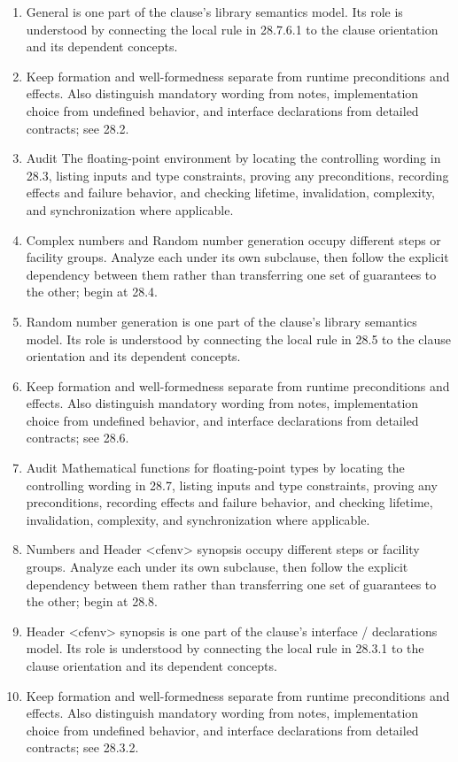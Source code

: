 \documentclass[11pt,letterpaper]{article}
\begin{document}
\begin{enumerate}
\item General is one part of the clause's library semantics model. Its role is understood by connecting the local rule in 28.7.6.1 to the clause orientation and its dependent concepts.
\item Keep formation and well-formedness separate from runtime preconditions and effects. Also distinguish mandatory wording from notes, implementation choice from undefined behavior, and interface declarations from detailed contracts; see 28.2.
\item Audit The floating-point environment by locating the controlling wording in 28.3, listing inputs and type constraints, proving any preconditions, recording effects and failure behavior, and checking lifetime, invalidation, complexity, and synchronization where applicable.
\item Complex numbers and Random number generation occupy different steps or facility groups. Analyze each under its own subclause, then follow the explicit dependency between them rather than transferring one set of guarantees to the other; begin at 28.4.
\item Random number generation is one part of the clause's library semantics model. Its role is understood by connecting the local rule in 28.5 to the clause orientation and its dependent concepts.
\item Keep formation and well-formedness separate from runtime preconditions and effects. Also distinguish mandatory wording from notes, implementation choice from undefined behavior, and interface declarations from detailed contracts; see 28.6.
\item Audit Mathematical functions for floating-point types by locating the controlling wording in 28.7, listing inputs and type constraints, proving any preconditions, recording effects and failure behavior, and checking lifetime, invalidation, complexity, and synchronization where applicable.
\item Numbers and Header <cfenv> synopsis occupy different steps or facility groups. Analyze each under its own subclause, then follow the explicit dependency between them rather than transferring one set of guarantees to the other; begin at 28.8.
\item Header <cfenv> synopsis is one part of the clause's interface / declarations model. Its role is understood by connecting the local rule in 28.3.1 to the clause orientation and its dependent concepts.
\item Keep formation and well-formedness separate from runtime preconditions and effects. Also distinguish mandatory wording from notes, implementation choice from undefined behavior, and interface declarations from detailed contracts; see 28.3.2.

\end{enumerate}
\end{document}
